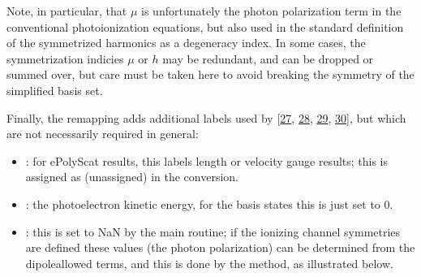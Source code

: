 \documentclass[letterpaper,table,10pt,english]{jupyterBook}
\begin{document}
\sphinxAtStartPar
Note, in particular, that \(\mu\) is \sphinxhyphen{} unfortunately \sphinxhyphen{} the photon polarization term in the conventional photoionization equations, but also used in the standard definition of the symmetrized harmonics as a degeneracy index. In some cases, the symmetrization indicies \(\mu\) or \(h\) may be redundant, and can be dropped or summed over, but care must be taken here to avoid breaking the symmetry of the simplified basis set.

\sphinxAtStartPar
Finally, the remapping adds additional labels used by  {[}\hyperlink{cite.backmatter/bibliography:id747}{27}, \hyperlink{cite.backmatter/bibliography:id617}{28}, \hyperlink{cite.backmatter/bibliography:id786}{29}, \hyperlink{cite.backmatter/bibliography:id750}{30}{]}, but which are not necessarily required in general:
\begin{itemize}
\item {} 
\sphinxAtStartPar
{}: for ePolyScat results, this labels length or velocity gauge results; this is assigned as  (unassigned) in the conversion.

\item {} 
\sphinxAtStartPar
{}: the photoelectron kinetic energy, for the basis states this is just set to 0.

\item {} 
\sphinxAtStartPar
{}: this is set to NaN by the main routine; if the ionizing channel symmetries are defined these values (the photon polarization) can be determined from the dipole\sphinxhyphen{}allowed terms, and this is done by the  method, as illustrated below.

\end{itemize}
\end{document}
